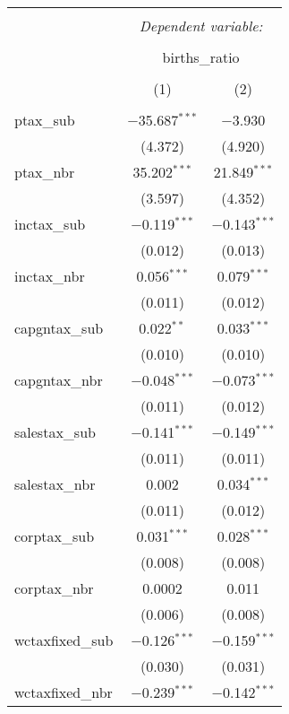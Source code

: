 
\begin{table}[!htbp] \centering 
  \caption{} 
  \label{} 
\begin{tabular}{@{\extracolsep{5pt}}lcc} 
\\[-1.8ex]\hline 
\hline \\[-1.8ex] 
 & \multicolumn{2}{c}{\textit{Dependent variable:}} \\ 
\cline{2-3} 
\\[-1.8ex] & \multicolumn{2}{c}{births\_ratio} \\ 
\\[-1.8ex] & (1) & (2)\\ 
\hline \\[-1.8ex] 
 ptax\_sub & $-$35.687$^{***}$ & $-$3.930 \\ 
  & (4.372) & (4.920) \\ 
  ptax\_nbr & 35.202$^{***}$ & 21.849$^{***}$ \\ 
  & (3.597) & (4.352) \\ 
  inctax\_sub & $-$0.119$^{***}$ & $-$0.143$^{***}$ \\ 
  & (0.012) & (0.013) \\ 
  inctax\_nbr & 0.056$^{***}$ & 0.079$^{***}$ \\ 
  & (0.011) & (0.012) \\ 
  capgntax\_sub & 0.022$^{**}$ & 0.033$^{***}$ \\ 
  & (0.010) & (0.010) \\ 
  capgntax\_nbr & $-$0.048$^{***}$ & $-$0.073$^{***}$ \\ 
  & (0.011) & (0.012) \\ 
  salestax\_sub & $-$0.141$^{***}$ & $-$0.149$^{***}$ \\ 
  & (0.011) & (0.011) \\ 
  salestax\_nbr & 0.002 & 0.034$^{***}$ \\ 
  & (0.011) & (0.012) \\ 
  corptax\_sub & 0.031$^{***}$ & 0.028$^{***}$ \\ 
  & (0.008) & (0.008) \\ 
  corptax\_nbr & 0.0002 & 0.011 \\ 
  & (0.006) & (0.008) \\ 
  wctaxfixed\_sub & $-$0.126$^{***}$ & $-$0.159$^{***}$ \\ 
  & (0.030) & (0.031) \\ 
  wctaxfixed\_nbr & $-$0.239$^{***}$ & $-$0.142$^{***}$ \\ 

\end{tabular}
\end{table}
